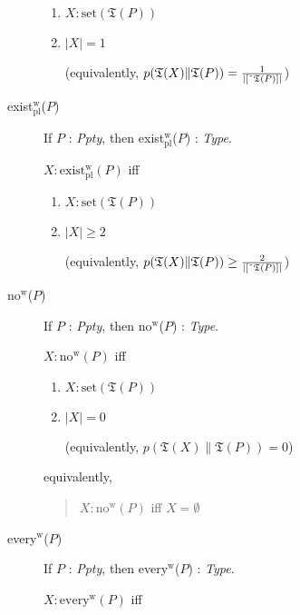 \begin{description}
\begin{description}
\begin{enumerate}
\item $X:\mathrm{set}(\mathfrak{T}(P))$ 
 
\item $|X|=1$

  (equivalently, $p(\mathfrak{T}(X)\|\mathfrak{T}(P))=\frac{1}{|[\ \!\check{}\ \!\mathfrak{T}(P)]|}$)
 
\end{enumerate}

\item[\textnormal{exist$_{\text{pl}}^{\text{w}}$($P$)}] \mbox{}

  If $P$ : \textit{Ppty}, then exist$_{\text{pl}}^{\text{w}}$($P$) :
  \textit{Type}.

  $X:\text{exist}_{\text{pl}}^{\text{w}}(P)$ iff
\begin{enumerate} 
 
\item $X:\mathrm{set}(\mathfrak{T}(P))$ 
 
\item $|X|\geq 2$

  (equivalently, $p(\mathfrak{T}(X)\|\mathfrak{T}(P))\geq\frac{2}{|[\ \!\check{}\ \!\mathfrak{T}(P)]|}$)
 
\end{enumerate}

\item[\textnormal{no$^{\text{w}}$($P$)}] \mbox{}

  If $P$ : \textit{Ppty}, then no$^{\text{w}}$($P$) : \textit{Type}.

  $X:\text{no}^{\text{w}}(P)$ iff
\begin{enumerate} 
 
\item $X:\mathrm{set}(\mathfrak{T}(P))$ 
 
\item $|X|=0$


(equivalently, $p(\mathfrak{T}(X)\|\mathfrak{T}(P))=0$)
\end{enumerate}
  equivalently,
\begin{quote}
  $X:\text{no}^{\text{w}}(P)$ iff $X=\emptyset$
\end{quote}

\item[\textnormal{every$^{\text{w}}$($P$)}] \mbox{}

  If $P$ : \textit{Ppty}, then every$^{\text{w}}$($P$) :
  \textit{Type}.

  $X:\text{every}^{\text{w}}(P)$ iff
\begin{enumerate} 
 

\end{enumerate}
\end{description}
\end{description}
